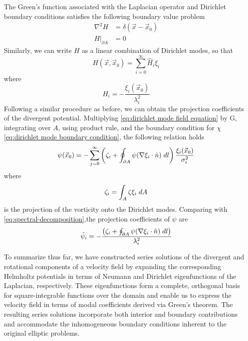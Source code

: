 \documentclass[draft]{agujournal2019}
\begin{document}
The Green's function associated with the Laplacian operator and Dirichlet boundary conditions satisfies the following boundary value problem
\begin{subequations}
    \begin{align}
        \nabla^2 H &= \delta(\vec{x}-\vec{x}_0)  \label{eq:dirichlet greens field equation} \\
        H |_{\partial A} &= 0 \label{eq:dirichlet greens boundary condition}
    \end{align}
\end{subequations}
Similarly, we can write $H$ as a linear combination of Dirichlet modes, so that
\begin{equation}
    H(\vec{x},\vec{x}_0) = \sum_{i=0}^\infty \hat{H}_i \xi_i\label{eq:dirichlet greens expansion}
\end{equation}
where 
\begin{equation}
    \hat{H}_i = -\frac{\xi_i(\vec{x}_0)}{\lambda_i^2}\label{eq:dirichlet greens coefficients}
\end{equation}
Following a similar procedure as before, we can obtain the projection coefficients of the divergent potential.  Multiplying \eqref{eq:dirichlet mode field equation} by G, integrating over $A$, using product rule, and the boundary condition for $\chi$ \eqref{eq:dirichlet mode boundary condition}, the following relation holds
\begin{equation}
    \psi(\vec{x}_0) = -\sum_{j=0}^\infty \left( \zeta_i + \oint_{\partial A} \psi (\nabla \xi_i \cdot \hat{n}) \hspace{1mm} dl \right)\frac{\xi_i(\vec{x}_0)}{\sigma_i^2}
\end{equation}
where 
\begin{equation}
    \zeta_i = \int_A \zeta \xi_i \hspace{1mm} dA
\end{equation}
is the projection of the vorticity onto the Dirichlet modes. Comparing with \eqref{eq:spectral-decomposition},the projection coefficients of $\psi$ are
\begin{equation}
    \hat{\psi}_i = - \frac{\left( \zeta_i + \oint_{\partial A} \psi (\nabla \xi_i \cdot \hat{n}) \hspace{1mm} dl \right)}{\lambda_i^2} \label{eq:rotational-modal-coefficients}
\end{equation}

To summarize thus far, we have constructed series solutions of the divergent and rotational components of a velocity field by expanding the corresponding Helmholtz potentials in terms of Neumann and Dirichlet eigenfunctions of the Laplacian, respectively. These eigenfunctions form a complete, orthogonal basis for square-integrable functions over the domain and enable us to express the velocity field in terms of modal coefficients derived via Green's theorem. The resulting series solutions incorporate both interior and boundary contributions and accommodate the inhomogeneous boundary conditions inherent to the original elliptic problems. 
\end{document}
